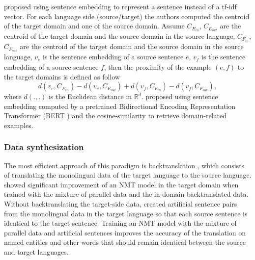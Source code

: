 \cite{Wang17sentence} proposed using sentence embedding to represent a sentence instead of a tf-idf vector. For each language side (source/target) the authors computed the centroid of the target domain and one of the source domain. Assume $C_{E_{in}}$, $C_{E_{out}}$ are the centroid of the target domain and the source domain in the source language,  $C_{F_{in}}$, $C_{F_{out}}$ are the centroid of the target domain and the source domain in the source language, $v_{\mathit{e}}$ is the sentence embedding of a source sentence $\mathit{e}$, $v_{\mathit{f}}$ is the sentence embedding of a source sentence $\mathit{f}$, then the proximity of the example $(\mathit{e},\mathit{f})$ to the target domains is defined as follow
\begin{equation}
d(v_{\mathit{e}}, C_{E_{in}}) - d(v_{\mathit{e}}, C_{E_{out}}) + d(v_{\mathit{f}}, C_{F_{in}}) - d(v_{\mathit{f}}, C_{F_{out}}),
\end{equation} 
where $d(.,.)$ is the Euclidean distance in $\mathbb{R}^d$. \cite{Aharoni20unsupervised} proposed using sentence embedding computed by a pretrained Bidirectional Encoding Representation Transformer (BERT ) and the cosine-similarity to retrieve domain-related examples.

\subsubsection{Data synthesization}
The most efficient approach of this paradigm is backtranslation \citep{Sennrich16improving}, which consists of translating the monolingual data of the target language to the source language. \citet{Burlot18using} showed significant improvement of an NMT model in the target domain when trained with the mixture of parallel data and the in-domain backtranslated data. Without backtranslating the target-side data, \citet{Currey17copied} created artificial sentence pairs from the monolingual data in the target language so that each source sentence is identical to the target sentence. Training an NMT model with the mixture of parallel data and artificial sentences improves the accuracy of the translation on named entities and other words that should remain identical between the source and target languages. 

